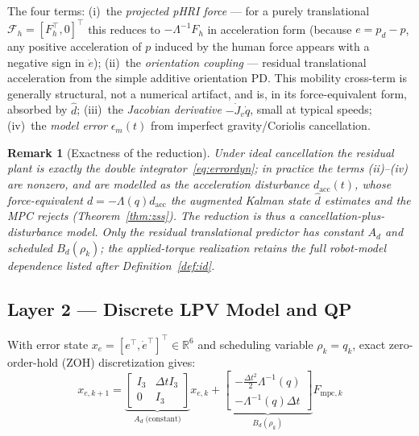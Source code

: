 \documentclass[journal]{IEEEtran}
\newtheorem{remark}{Remark}
\newcommand{\Laminv}{\Lambda^{-1}(q)}
\newcommand{\Fmpck}[1]{F_{\text{mpc},#1}}
\newcommand{\dhat}{\hat{d}}
\begin{document}
The four terms: (i)~the \emph{projected pHRI force} — for a purely
translational $\mathcal{F}_h=[F_h^\top,0]^\top$ this reduces to
$-\Lambda^{-1}F_h$ in acceleration form (because $e=p_d-p$, any positive
acceleration of $p$ induced by the human force appears with a negative sign
in $\ddot e$);
(ii)~the \emph{orientation coupling} — residual translational
acceleration from the simple additive orientation PD. This mobility
cross-term is generally structural, not a numerical artifact, and is,
in its force-equivalent form, absorbed by $\dhat$;
(iii)~the \emph{Jacobian derivative} $-\dot{J}_v\dot{q}$, small at
typical speeds; (iv)~the \emph{model error} $\epsilon_m(t)$ from
imperfect gravity/Coriolis cancellation.

\begin{remark}[Exactness of the reduction]
Under \emph{ideal} cancellation the residual plant is exactly the double
integrator~\eqref{eq:errordyn}; in practice the terms
(ii)--(iv) are nonzero, and are
\emph{modelled} as the acceleration disturbance $d_{\text{acc}}(t)$, whose
force-equivalent $d=-\Lambda(q)d_{\text{acc}}$ the augmented Kalman state
$\dhat$ estimates and the MPC rejects (Theorem~\ref{thm:zss}). The reduction is
thus a \emph{cancellation-plus-disturbance} model. Only the residual translational predictor has constant $A_d$ and
scheduled $B_d(\rho_k)$; the applied-torque realization retains the full
robot-model dependence listed after Definition~\ref{def:id}.
\end{remark}

\subsection{Layer 2 --- Discrete LPV Model and QP}\label{sec:layer2}

With error state $x_e=[e^\top,\dot{e}^\top]^\top\in\mathbb{R}^6$ and
scheduling variable $\rho_k=q_k$, exact zero-order-hold (ZOH) discretization gives:
\begin{equation}\label{eq:lpv}
  x_{e,k+1} = \underbrace{\begin{bmatrix}I_3&\Delta t I_3\\0&I_3\end{bmatrix}}_{A_d\;\text{(constant)}}
              x_{e,k}
            + \underbrace{\begin{bmatrix}-\tfrac{\Delta t^2}{2}\Laminv\\-\Laminv\Delta t\end{bmatrix}}_{B_d(\rho_k)}
              \Fmpck{k}
\end{equation}
\end{document}
